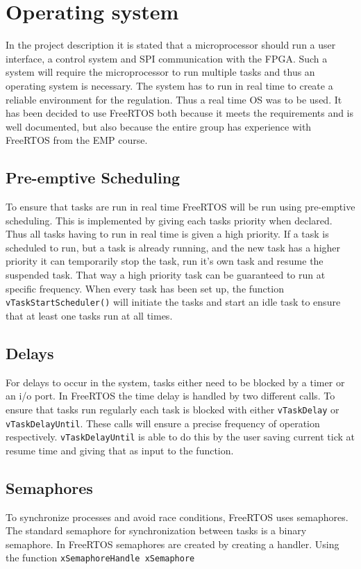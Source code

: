 \chapter{Operating system}\label{chap:os}
In the project description it is stated that a microprocessor should run a user interface, a control system and SPI communication with the FPGA. Such a system will require the microprocessor to run multiple tasks and thus an operating system is necessary. The system has to run in real time to create a reliable environment for the regulation. Thus a real time OS was to be used. It has been decided to use FreeRTOS both because it meets the requirements and is well documented, but also because the entire group has experience with FreeRTOS from the EMP course.

\section{Pre-emptive Scheduling}
To ensure that tasks are run in real time FreeRTOS will be run using pre-emptive scheduling. This is implemented by giving each tasks priority when declared. Thus all tasks having to run in real time is given a high priority. If a task is scheduled to run, but a task is already running, and the new task has a higher priority it can temporarily stop the task, run it's own task and resume the suspended task. That way a high priority task can be guaranteed to run at specific frequency. When every task has been set up, the function \texttt{vTaskStartScheduler()} will initiate the tasks and start an idle task to ensure that at least one tasks run at all times.

\section{Delays}
For delays to occur in the system, tasks either need to be blocked by a timer or an i/o port. In FreeRTOS the time delay is handled by two different calls. To ensure that tasks run regularly each task is blocked with either \texttt{vTaskDelay} or \texttt{vTaskDelayUntil}. These calls will ensure a precise frequency of operation respectively. \texttt{vTaskDelayUntil} is able to do this by the user saving current tick at resume time and giving that as input to the function.
 
\section{Semaphores}
To synchronize processes and avoid race conditions, FreeRTOS uses semaphores. The standard semaphore for synchronization between tasks is a binary semaphore. In FreeRTOS semaphores are created by creating a handler. Using the function \texttt{xSemaphoreHandle xSemaphore}


